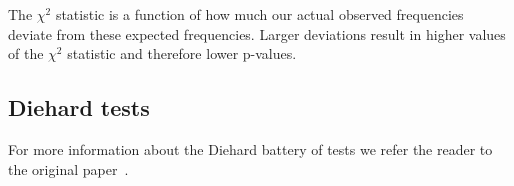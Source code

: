 




The $\chi^2$ statistic is a function of how much our actual observed frequencies deviate from these expected frequencies. 
Larger deviations result in higher values of the $\chi^2$ statistic and therefore lower p-values.




\subsection{Diehard tests}

For more information about the Diehard battery of tests we refer the reader to the original paper~\cite{currentRNG}.
